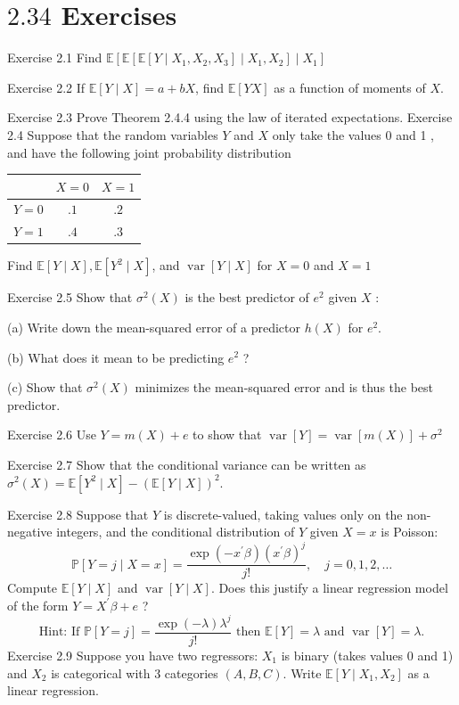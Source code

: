 \documentclass[10pt]{article}
\begin{document}
\section{$2.34$ Exercises}
Exercise 2.1 Find $\mathbb{E}\left[\mathbb{E}\left[\mathbb{E}\left[Y \mid X_{1}, X_{2}, X_{3}\right] \mid X_{1}, X_{2}\right] \mid X_{1}\right]$

Exercise 2.2 If $\mathbb{E}[Y \mid X]=a+b X$, find $\mathbb{E}[Y X]$ as a function of moments of $X$.

Exercise 2.3 Prove Theorem 2.4.4 using the law of iterated expectations. Exercise 2.4 Suppose that the random variables $Y$ and $X$ only take the values 0 and 1 , and have the following joint probability distribution

\begin{tabular}{|c|cc|}
\hline
 & $X=0$ & $X=1$ \\
\hline
$Y=0$ & $.1$ & $.2$ \\
$Y=1$ & $.4$ & $.3$ \\
\hline
\end{tabular}

Find $\mathbb{E}[Y \mid X], \mathbb{E}\left[Y^{2} \mid X\right]$, and $\operatorname{var}[Y \mid X]$ for $X=0$ and $X=1$

Exercise 2.5 Show that $\sigma^{2}(X)$ is the best predictor of $e^{2}$ given $X$ :

(a) Write down the mean-squared error of a predictor $h(X)$ for $e^{2}$.

(b) What does it mean to be predicting $e^{2}$ ?

(c) Show that $\sigma^{2}(X)$ minimizes the mean-squared error and is thus the best predictor.

Exercise 2.6 Use $Y=m(X)+e$ to show that $\operatorname{var}[Y]=\operatorname{var}[m(X)]+\sigma^{2}$

Exercise 2.7 Show that the conditional variance can be written as $\sigma^{2}(X)=\mathbb{E}\left[Y^{2} \mid X\right]-(\mathbb{E}[Y \mid X])^{2}$.

Exercise 2.8 Suppose that $Y$ is discrete-valued, taking values only on the non-negative integers, and the conditional distribution of $Y$ given $X=x$ is Poisson:
$$
\mathbb{P}[Y=j \mid X=x]=\frac{\exp \left(-x^{\prime} \beta\right)\left(x^{\prime} \beta\right)^{j}}{j !}, \quad j=0,1,2, \ldots
$$
Compute $\mathbb{E}[Y \mid X]$ and $\operatorname{var}[Y \mid X]$. Does this justify a linear regression model of the form $Y=X^{\prime} \beta+e$ ?
$$
\text { Hint: If } \mathbb{P}[Y=j]=\frac{\exp (-\lambda) \lambda^{j}}{j !} \text { then } \mathbb{E}[Y]=\lambda \text { and } \operatorname{var}[Y]=\lambda \text {. }
$$
Exercise 2.9 Suppose you have two regressors: $X_{1}$ is binary (takes values 0 and 1) and $X_{2}$ is categorical with 3 categories $(A, B, C)$. Write $\mathbb{E}\left[Y \mid X_{1}, X_{2}\right]$ as a linear regression.
\end{document}
